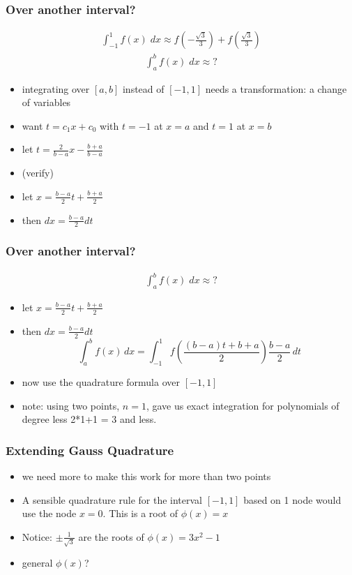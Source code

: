 \documentclass[10pt]{beamer}
\begin{document}
\begin{frame}
\frametitle{Over another interval?}
\begin{eqnarray*}
  \int_{-1}^1 f(x) \; \mathit{dx} \approx f\left(-\frac{\sqrt{3}}{3}
  \right) + f\left(\frac{\sqrt{3}}{3} \right)
\end{eqnarray*}
\begin{eqnarray*}
  \int_{a}^b f(x) \; \mathit{dx} \approx ?
\end{eqnarray*}
\begin{itemize}
  \item integrating over $[a,b]$ instead of $[-1,1]$ needs a transformation:
  a change of variables
  \item want $t = c_1 x + c_0$ with $t=-1$ at $x=a$ and $t=1$ at $x=b$
  \item let $ t = \frac{2}{b-a}x-\frac{b+a}{b-a}$
  \item (verify)
  \item let $ x = \frac{b-a}{2}t+\frac{b+a}{2}$
  \item then $dx = \frac{b-a}{2} dt$
\end{itemize}
\end{frame}
\begin{frame}
\frametitle{Over another interval?}
\begin{eqnarray*}
  \int_{a}^b f(x) \; \mathit{dx} \approx ?
\end{eqnarray*}
\begin{itemize}
  \item let $ x = \frac{b-a}{2}t+\frac{b+a}{2}$
  \item then $dx = \frac{b-a}{2} dt$
  \begin{equation*}
    \int_a^b f(x)\,dx = \int_{-1}^{1}
    f\left(\frac{(b-a)t+b+a}{2}\right)\frac{b-a}{2}\,dt
  \end{equation*}
  \item now use the quadrature formula over $[-1,1]$
  \item note: using two points, $n=1$, gave us exact integration for polynomials of
  degree less 2*1+1 = 3 and less.
\end{itemize}
\end{frame}
\begin{frame}
\frametitle{Extending Gauss Quadrature}
  \begin{itemize}
    \item we need more to make this work for more than two points
    \item A sensible quadrature rule for the interval $[-1,1]$ based on 1
    node would use the node $x=0$.  This is a root of $\phi(x)=x$
    \item Notice: $\pm\frac{1}{\sqrt{3}}$ are the roots of $\phi(x)=3x^2
    -1$
    \item general $\phi(x)$?
  \end{itemize}
\end{frame}
\end{document}
